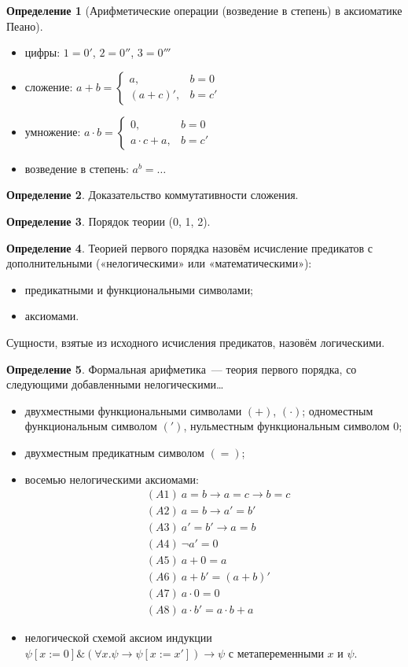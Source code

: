 \documentclass[a4paper,11pt]{article}
\theoremstyle{definition}
\newtheorem*{dfn}{Определение}
\newcommand{\amp}{\mathbin{\&}}
\begin{document}
\begin{dfn}[Арифметические операции (возведение в степень) в аксиоматике Пеано]
\begin{itemize}
\item цифры: $1 = 0'$, $2 = 0''$, $3 = 0'''$
\item сложение: $a + b = \begin{cases} a, & b = 0\\ (a + c)', & b = c'\end{cases}$
\item умножение: $a \cdot b = \begin{cases} 0, & b = 0\\ a \cdot c + a, & b = c'\end{cases}$
\item возведение в степень: $a^b = \dots$
\end{itemize}
\end{dfn}
\begin{dfn}
Доказательство коммутативности сложения.
\end{dfn}
\begin{dfn}
Порядок теории (0, 1, 2).
\end{dfn}
\begin{dfn}
Теорией первого порядка назовём исчисление предикатов с дополнительными
(«нелогическими» или «математическими»):
\begin{itemize}
\item предикатными и функциональными символами;
\item аксиомами.
\end{itemize}
Сущности, взятые из исходного исчисления предикатов, назовём логическими.
\end{dfn}
\begin{dfn}
Формальная арифметика~--- теория первого порядка, со следующими добавленными
нелогическими\dots
\begin{itemize}
\item двухместными функциональными символами $(+)$, $(\cdot)$; одноместным
  функциональным символом $(')$, нульместным функциональным символом $0$;
\item двухместным предикатным символом $(=)$;
\item восемью нелогическими аксиомами:
  \begin{align*}
  &(A1)\ a = b \to a = c \to b = c\\
  &(A2)\ a = b \to a' = b'\\
  &(A3)\ a' = b' \to a = b\\
  &(A4)\ \neg a' = 0\\
  &(A5)\ a + 0 = a\\
  &(A6)\ a + b' = (a + b)'\\
  &(A7)\ a \cdot 0 = 0\\
  &(A8)\ a \cdot b' = a \cdot b + a
  \end{align*}
\item нелогической схемой аксиом индукции $\psi[x := 0] \amp (\forall x.\psi \to
  \psi[x := x']) \to \psi$ с метапеременными $x$ и $\psi$.
\end{itemize}
\end{dfn}
\end{document}
